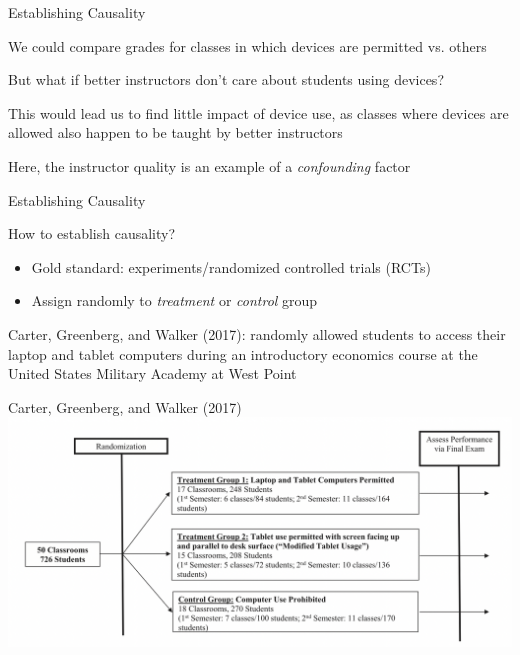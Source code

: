 \documentclass{./../div_teaching_slides}
\begin{document}
\begin{frame}{Establishing Causality}
\begin{witemize}
\item We could compare grades for classes in which devices are permitted vs. others
\item But what if better instructors don't care about students using devices?
\item This would lead us to find little impact of device use, as classes where devices are allowed also happen to be taught by better instructors
\item Here, the instructor quality is an example of a \textit{confounding} factor
\end{witemize}
\end{frame}

\begin{frame}{Establishing Causality}
\begin{witemize}
\item How to establish causality? \\
\begin{itemize}
\item\normalsize Gold standard: experiments/randomized controlled trials (RCTs)
\item Assign randomly to \textit{treatment} or \textit{control} group 
 \end{itemize} 
 \item Carter, Greenberg, and Walker (2017): randomly allowed students to access their laptop and tablet computers during an introductory economics course at the United States Military Academy at West Point
\end{witemize}
\end{frame}

\begin{frame}{Carter, Greenberg, and Walker (2017)}
 \includegraphics[scale=0.35]{exp.png}
\end{frame}
\end{document}
